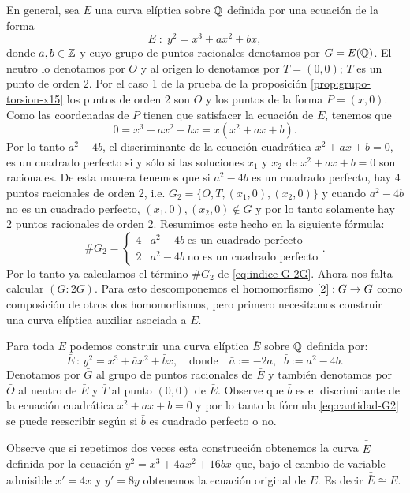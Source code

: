 \documentclass[../../tesis_maestria]{subfiles}
\begin{document}
En general, sea $E$ una curva elíptica sobre $\mathbb{Q}$ definida por una ecuación de la forma
\[
	E\; :\; y^2=x^3+ax^2+bx,
\]
donde $a,b\in\mathbb{Z}$ y cuyo grupo de puntos racionales denotamos por $G=E(\mathbb{Q})$. El neutro lo denotamos por $O$ y al origen lo denotamos por $T=(0,0)$; $T$ es un punto de orden 2. Por el caso 1 de la prueba de la proposición \ref{prop:grupo-torsion-x15} los puntos de orden 2 son $O$ y los puntos de la forma $P=(x,0)$. Como las coordenadas de $P$ tienen que satisfacer la ecuación de $E$, tenemos que
\[
	0=x^3+ax^2+bx=x(x^2+ax+b).
\]
Por lo tanto $a^2-4b$, el discriminante de la ecuación cuadrática $x^2+ax+b=0$, es un cuadrado perfecto si y sólo si las soluciones $x_1$ y $x_2$ de $x^2+ax+b=0$ son racionales. De esta manera tenemos que si $a^2-4b$ es un cuadrado perfecto, hay 4 puntos racionales de orden 2, i.e. $G_2=\{O,T,(x_1,0),(x_2,0)\}$ y cuando $a^2-4b$ no es un cuadrado perfecto, $(x_1,0),(x_2,0)\not\in G$ y por lo tanto solamente hay 2 puntos racionales de orden 2. Resumimos este hecho en la siguiente fórmula:
\begin{equation}\label{eq:cantidad-G2}
	\# G_2=	\begin{cases}
		4 & a^2-4b\;\text{es un cuadrado perfecto}\\
		2 & a^2-4b\;\text{no es un cuadrado perfecto}
	\end{cases}.
\end{equation}
Por lo tanto ya calculamos el término $\# G_2$ de \eqref{eq:indice-G-2G}. Ahora nos falta calcular $(G:2G)$. Para esto descomponemos el homomorfismo $[2]:G\rightarrow G$ como composición de otros dos homomorfismos, pero primero necesitamos construir una curva elíptica auxiliar asociada a $E$.

Para toda $E$ podemos construir una curva elíptica $\bar{E}$ sobre $\mathbb{Q}$ definida por:
\[
	\bar{E}\,:\, y^2=x^3+\bar{a}x^2+\bar{b}x,\quad\text{donde}\quad \bar{a}:=-2a,\;\;\bar{b}:=a^2-4b.
\]
Denotamos por $\bar{G}$ al grupo de puntos racionales de $\bar{E}$ y también denotamos por $\bar{O}$ al neutro de $\bar{E}$ y $\bar{T}$ al punto $(0,0)$ de $\bar{E}$. Observe que $\bar{b}$ es el discriminante de la ecuación cuadrática $x^2+ax+b=0$ y por lo tanto la fórmula \eqref{eq:cantidad-G2} se puede reescribir según si $\bar{b}$ es cuadrado perfecto o no.

Observe que si repetimos dos veces esta construcción obtenemos la curva $\bar{\bar{E}}$ definida por la ecuación $y^2=x^3+4ax^2+16bx$ que, bajo el cambio de variable admisible $x'=4x$ y $y'=8y$ obtenemos la ecuación original de $E$. Es decir $\bar{\bar{E}}\cong E$. 
\end{document}
